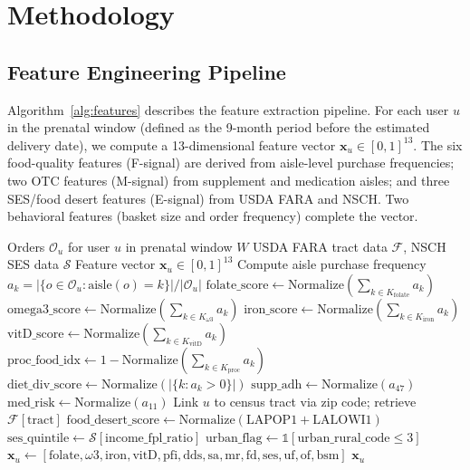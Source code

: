\documentclass[journal]{IEEEtran}
\begin{document}
\section{Methodology}
\label{sec:method}

\subsection{Feature Engineering Pipeline}

Algorithm~\ref{alg:features} describes the feature extraction
pipeline. For each user $u$ in the prenatal window (defined as
the 9-month period before the estimated delivery date), we compute
a 13-dimensional feature vector $\mathbf{x}_u \in [0,1]^{13}$.
The six food-quality features (F-signal) are derived from
aisle-level purchase frequencies; two OTC features (M-signal)
from supplement and medication aisles; and three SES/food desert
features (E-signal) from USDA FARA and NSCH. Two behavioral
features (basket size and order frequency) complete the vector.

\begin{algorithm}[t]
\caption{PrenatalSentinel Feature Extraction}
\label{alg:features}
\begin{algorithmic}[1]
\REQUIRE Orders $\mathcal{O}_u$ for user $u$ in prenatal window $W$
\REQUIRE USDA FARA tract data $\mathcal{F}$, NSCH SES data $\mathcal{S}$
\ENSURE Feature vector $\mathbf{x}_u \in [0,1]^{13}$
\STATE Compute aisle purchase frequency $a_k = |\{o \in \mathcal{O}_u : \text{aisle}(o)=k\}| / |\mathcal{O}_u|$
\STATE $\text{folate\_score} \leftarrow \text{Normalize}(\sum_{k \in K_{\text{folate}}} a_k)$
\STATE $\text{omega3\_score} \leftarrow \text{Normalize}(\sum_{k \in K_{\omega3}} a_k)$
\STATE $\text{iron\_score} \leftarrow \text{Normalize}(\sum_{k \in K_{\text{iron}}} a_k)$
\STATE $\text{vitD\_score} \leftarrow \text{Normalize}(\sum_{k \in K_{\text{vitD}}} a_k)$
\STATE $\text{proc\_food\_idx} \leftarrow 1 - \text{Normalize}(\sum_{k \in K_{\text{proc}}} a_k)$
\STATE $\text{diet\_div\_score} \leftarrow \text{Normalize}(|\{k : a_k > 0\}|)$
\STATE $\text{supp\_adh} \leftarrow \text{Normalize}(a_{47})$ 
\STATE $\text{med\_risk} \leftarrow \text{Normalize}(a_{11})$ 
\STATE Link $u$ to census tract via zip code; retrieve $\mathcal{F}[\text{tract}]$
\STATE $\text{food\_desert\_score} \leftarrow \text{Normalize}(\text{LAPOP1} + \text{LALOWI1})$
\STATE $\text{ses\_quintile} \leftarrow \mathcal{S}[\text{income\_fpl\_ratio}]$
\STATE $\text{urban\_flag} \leftarrow \mathbb{1}[\text{urban\_rural\_code} \leq 3]$
\STATE $\mathbf{x}_u \leftarrow [\text{folate}, \omega3, \text{iron}, \text{vitD}, \text{pfi}, \text{dds}, \text{sa}, \text{mr}, \text{fd}, \text{ses}, \text{uf}, \text{of}, \text{bsm}]$
\RETURN $\mathbf{x}_u$
\end{algorithmic}
\end{algorithm}
\end{document}
